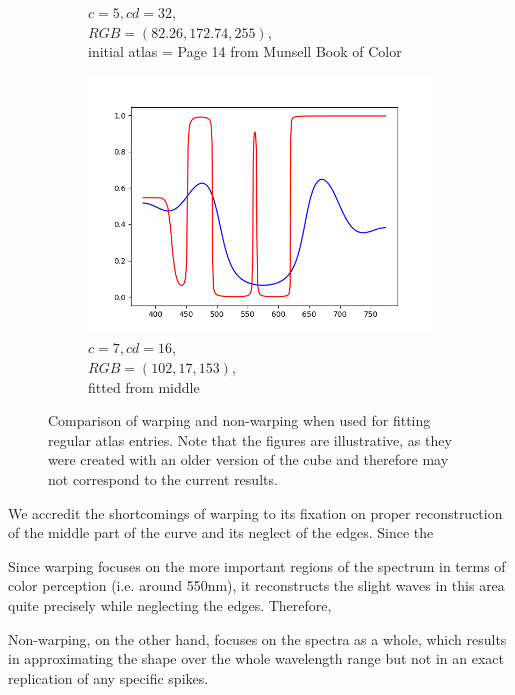 \begin{figure}[t]
\begin{subfigure}[t]{0.31\textwidth}
		\caption{$c=5, cd=32$,\\$RGB=(82.26, 172.74, 255)$,\\initial atlas = Page 14 from Munsell Book of Color}
		\label{fig:warping_regularPoints_m5_cd32}
	\end{subfigure}
	\begin{subfigure}[t]{0.31\textwidth}
		\includegraphics[width=\linewidth]{img/resultsTechniqueOpt_m7_cd16.png}
		\caption{$c=7, cd=16$,\\$RGB=(102, 17, 153)$,\\ fitted from middle}
		\label{fig:warping_regularPoints_m7_cd16}
	\end{subfigure} 
	\caption{Comparison of warping and non-warping when used for fitting regular atlas entries. Note that the figures are illustrative, as they were created with an older version of the cube and therefore may not correspond to the current results.}
	\label{fig:warping_regularPoints}
\end{figure}

We accredit the shortcomings of warping to its fixation on proper reconstruction of the middle part of the curve and its neglect of the edges. Since the 


 Since warping focuses on the more important regions of the spectrum in terms of color perception (i.e. around 550nm), it reconstructs the slight waves in this area quite precisely while neglecting the edges. Therefore, 

 Non-warping, on the other hand, focuses on the spectra as a whole, which results in approximating the shape over the whole wavelength range but not in an exact replication of any specific spikes.

